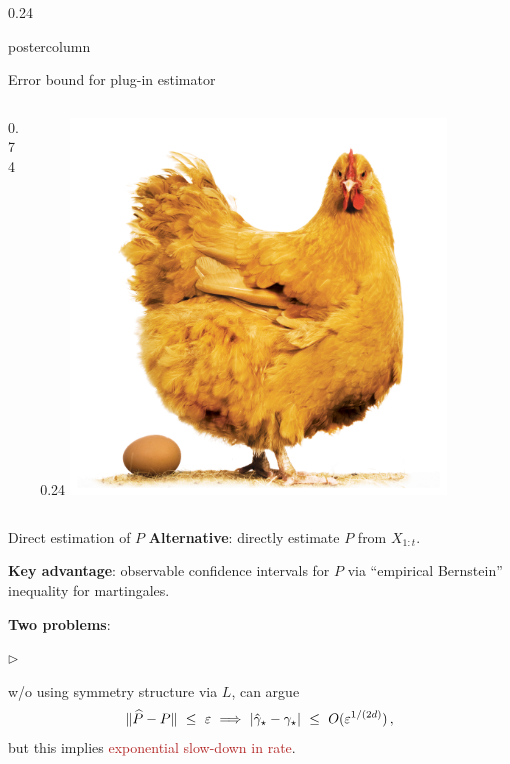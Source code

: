 \documentclass[notheorems,final]{beamer}
\newcommand{\compresslist}{%
  \setlength{\itemsep}{1pt}%
  \setlength{\parskip}{0pt}%
  \setlength{\parsep}{0pt}%
  \setlength{\leftmargin}{0.7cm}%
}
\newcommand{\FIREBRICK}[1]{\textcolor{firebrick}{#1}}
\newcommand\gap{\ensuremath{\gamma_{\star}}}
\newcommand\hatgap{\ensuremath{\hat{\gamma}_{\star}}}
\begin{document}
\begin{frame}{}
\begin{columns}
\begin{column}{0.24\textwidth}
\begin{beamercolorbox}[center,wd=\textwidth]{postercolumn}
\begin{minipage}[T]{.95\textwidth}
{\begin{block}{Error bound for plug-in estimator}
\begin{columns}
\begin{column}{0.74\textwidth}
\begin{center}
                    \end{center}
                  \end{column}
                  \begin{column}{0.24\textwidth}
                    \includegraphics[width=0.80\textwidth]{chicken-and-egg.jpg}
                  \end{column}
                \end{columns}
              \end{block}

              \begin{block}{Direct estimation of $P$}
                \textbf{Alternative}: directly estimate $P$ from $X_{1:t}$.

                \smallskip
                \textbf{Key advantage}: observable confidence
                intervals for $P$ via ``empirical Bernstein''
                inequality for martingales.

                \smallskip
                \textbf{Two problems}:
                \begin{list}{$\triangleright$}\compresslist
                  \item
                    w/o using symmetry structure via $L$, can argue
                    \[
                      \norm{\wh{P} - P} \ \leq \ \veps
                      \ \Longrightarrow \
                      \abs{\hatgap - \gap} \ \leq \ O(\veps^{1/(2d)})
                      \,,
                    \]
                    but this implies \FIREBRICK{exponential slow-down in rate}.


\end{list}
\end{block}}
\end{minipage}
\end{beamercolorbox}
\end{column}
\end{columns}
\end{frame}
\end{document}
